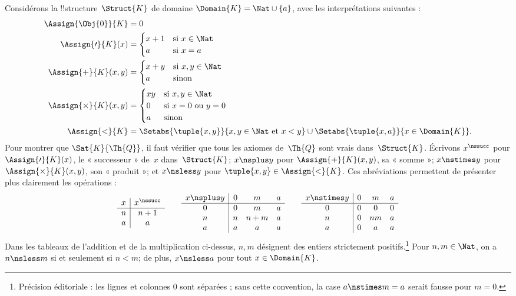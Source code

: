 \documentclass[../../../include/open-logic-section]{subfiles}
\begin{document}
\begin{ex}
Considérons la !!{structure}~$\Struct{K}$ de domaine
$\Domain{K}=\Nat\cup\{a\}$, avec les interprétations
suivantes :
\begin{align*}
  \Assign{\Obj{0}}{K} & = 0\\
  \Assign{\prime}{K}(x) & =
  \begin{cases}
    x+1 & \text{si $x\in\Nat$}\\
    a & \text{si $x=a$}
  \end{cases}\\
  \Assign{+}{K}(x,y) & =
  \begin{cases}
    x+y & \text{si $x,y\in\Nat$}\\
    a & \text{sinon}
  \end{cases}\\
  \Assign{\times}{K}(x,y) & =
  \begin{cases}
    xy & \text{si $x,y\in\Nat$}\\
    0 & \text{si $x=0$ ou $y=0$}\\
    a & \text{sinon}
  \end{cases}\\
  \Assign{<}{K} & =
  \Setabs{\tuple{x,y}}{x,y\in\Nat\text{ et }x<y}
  \cup\Setabs{\tuple{x,a}}{x\in\Domain{K}}.
\end{align*}
Pour montrer que $\Sat{K}{\Th{Q}}$, il faut
vérifier que tous les axiomes de~$\Th{Q}$ sont
vrais dans~$\Struct{K}$. Écrivons
$x^\nssucc$ pour $\Assign{\prime}{K}(x)$,
le « successeur » de~$x$ dans~$\Struct{K}$;
$x\nsplus y$ pour $\Assign{+}{K}(x,y)$,
sa « somme »; $x\nstimes y$ pour
$\Assign{\times}{K}(x,y)$, son « produit »;
et $x\nsless y$ pour
$\tuple{x,y}\in\Assign{<}{K}$.
Ces abréviations permettent de présenter
plus clairement les opérations :
\[
\begin{array}{c|c}
  x & x^\nssucc \\
  \hline
  n & n+1 \\
  a & a
\end{array}
\qquad
\begin{array}{c|ccc}
  x\nsplus y & 0 & m & a \\
  \hline
  0 & 0 & m & a \\
  n & n & n+m & a \\
  a & a & a & a
\end{array}
\qquad
\begin{array}{c|ccc}
  x\nstimes y & 0 & m & a \\
  \hline
  0 & 0 & 0 & 0 \\
  n & 0 & nm & a \\
  a & 0 & a & a
\end{array}
\]
Dans les tableaux de l'addition et de la multiplication ci-dessus, $n,m$ désignent des entiers strictement positifs.\footnote{Précision éditoriale : les lignes et colonnes $0$ sont séparées ; sans cette convention, la case $a\nstimes m=a$ serait fausse pour $m=0$.} Pour $n,m\in\Nat$, on a $n\nsless m$
si et seulement si $n<m$; de plus,
$x\nsless a$ pour tout $x\in\Domain{K}$.


\end{ex}
\end{document}

